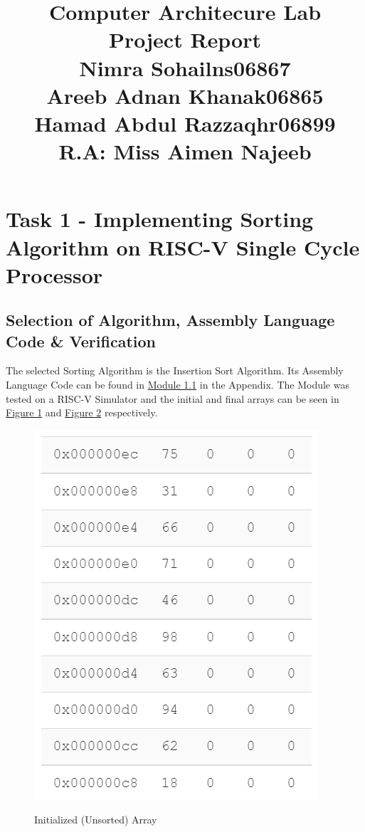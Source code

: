 \documentclass[12pt]{article}
\title{\textbf{\Huge Computer Architecure Lab}\\\textbf{\Huge Project Report}\\\vspace{30pt}Nimra Sohail\hspace{95pt}ns06867\\Areeb Adnan Khan\hspace{43pt}ak06865\\Hamad Abdul Razzaq\hspace{22pt}hr06899\\\vspace{30pt}\textbf{R.A: Miss Aimen Najeeb}}
\date{}
\begin{document}
\maketitle
\pagebreak
\section*{\Huge Task 1 - Implementing Sorting Algorithm on RISC-V Single Cycle Processor}
\subsection*{\Large Selection of Algorithm, Assembly Language Code \& Verification}
The selected Sorting Algorithm is the Insertion Sort Algorithm. Its Assembly Language Code can be found in \hyperref[ins_sort]{Module 1.1} in the Appendix. The Module was tested on a RISC-V Simulator and the initial and final arrays can be seen in \hyperref[img1]{Figure 1} and \hyperref[img2]{Figure 2} respectively.
\begin{figure}[H]
    \centering
    \includegraphics[scale = 1]{../images/Unsorted Array.png}
    \label{img1}
    \caption{Initialized (Unsorted) Array}
\end{figure}
\end{document}
